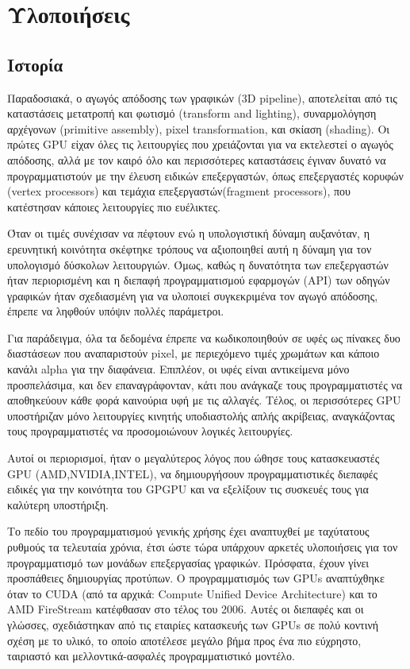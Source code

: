 \chapter{Υλοποιήσεις}
\section{Ιστορία}
Παραδοσιακά, ο αγωγός απόδοσης των γραφικών (3D pipeline), αποτελείται από τις καταστάσεις μετατροπή και φωτισμό (transform and lighting), συναρμολόγηση αρχέγονων (primitive assembly), pixel transformation, και σκίαση (shading). Οι πρώτες GPU είχαν όλες τις λειτουργίες που χρειάζονται για να εκτελεστεί ο αγωγός απόδοσης, αλλά με τον καιρό όλο και περισσότερες καταστάσεις έγιναν δυνατό να προγραμματιστούν με την έλευση ειδικών επεξεργαστών, όπως επεξεργαστές κορυφών (vertex processors) και τεμάχια επεξεργαστών(fragment processors), που κατέστησαν κάποιες λειτουργίες πιο ευέλικτες.

Όταν οι τιμές συνέχισαν να πέφτουν ενώ η υπολογιστική δύναμη αυξανόταν, η ερευνητική κοινότητα σκέφτηκε τρόπους να αξιοποιηθεί αυτή η δύναμη για τον υπολογισμό δύσκολων λειτουργιών. Όμως, καθώς η δυνατότητα των επεξεργαστών ήταν περιορισμένη και η διεπαφή προγραμματισμού εφαρμογών (API) των οδηγών γραφικών ήταν σχεδιασμένη για να υλοποιεί συγκεκριμένα τον αγωγό απόδοσης, έπρεπε να ληφθούν υπόψιν πολλές παράμετροι.

Για παράδειγμα, όλα τα δεδομένα έπρεπε να κωδικοποιηθούν σε υφές ως πίνακες δυο διαστάσεων που αναπαριστούν pixel, με περιεχόμενο τιμές χρωμάτων και κάποιο κανάλι alpha για την διαφάνεια. Επιπλέον, οι υφές είναι αντικείμενα μόνο προσπελάσιμα, και δεν επαναγράφονταν, κάτι που ανάγκαζε τους προγραμματιστές να αποθηκεύουν κάθε φορά καινούρια υφή με τις αλλαγές. Τέλος, οι περισσότερες GPU υποστήριζαν μόνο λειτουργίες κινητής υποδιαστολής απλής ακρίβειας, αναγκάζοντας τους προγραμματιστές να προσομοιώνουν λογικές λειτουργίες.

Αυτοί οι περιορισμοί, ήταν ο μεγαλύτερος λόγος που ώθησε τους κατασκευαστές GPU (AMD,NVIDIA,INTEL), να δημιουργήσουν προγραμματιστικές διεπαφές ειδικές για την κοινότητα του GPGPU και να εξελίξουν τις συσκευές τους για καλύτερη υποστήριξη.

Το πεδίο του προγραμματισμού γενικής χρήσης έχει αναπτυχθεί με ταχύτατους ρυθμούς τα τελευταία χρόνια, έτσι ώστε τώρα υπάρχουν αρκετές υλοποιήσεις για τον προγραμματισμό των μονάδων επεξεργασίας γραφικών. Πρόσφατα, έχουν γίνει προσπάθειες δημιουργίας προτύπων.
Ο προγραμματισμός των GPUs αναπτύχθηκε όταν το CUDA (από τα αρχικά: Compute Unified Device Architecture) και το AMD FireStream κατέφθασαν στο τέλος του 2006. Αυτές οι διεπαφές και οι γλώσσες, σχεδιάστηκαν από τις εταιρίες κατασκευής των GPUs σε πολύ κοντινή σχέση με το υλικό, το οποίο αποτέλεσε μεγάλο βήμα προς ένα πιο εύχρηστο, ταιριαστό και μελλοντικά-ασφαλές προγραμματιστικό μοντέλο.

